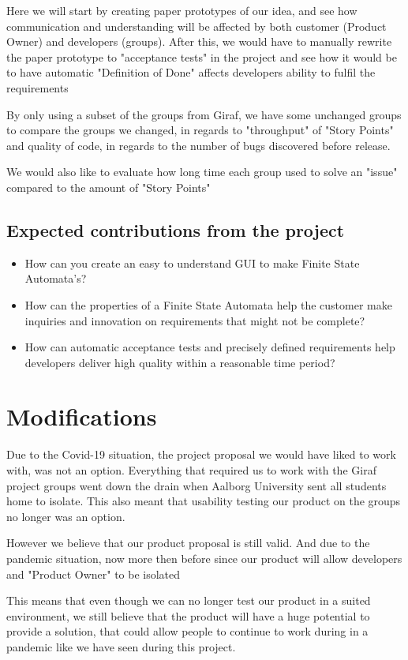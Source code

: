 Here we will start by creating paper prototypes of our idea, and see how communication and understanding will be affected by both customer (Product Owner) and developers (groups).
After this, we would have to manually rewrite the paper prototype to "acceptance tests" in the project and see how it would be to have automatic "Definition of Done" affects developers ability to fulfil the requirements

By only using a subset of the groups from Giraf, we have some unchanged groups to compare the groups we changed, in regards to "throughput" of "Story Points" and quality of code, in regards to the number of bugs discovered before release.

We would also like to evaluate how long time each group used to solve an "issue" compared to the amount of "Story Points" 


\subsection{Expected contributions from the project}
\begin{itemize}
    \item How can you create an easy to understand GUI to make Finite State Automata's?
    \item How can the properties of a Finite State Automata help the customer make inquiries and innovation on requirements that might not be complete?
    \item How can automatic acceptance tests and precisely defined requirements help developers deliver high quality within a reasonable time period?
\end{itemize}
\section{Modifications}
Due to the Covid-19 situation, the project proposal we would have liked to work with, was not an option.
Everything that required us to work with the Giraf project groups went down the drain when Aalborg University sent all students home to isolate.
This also meant that usability testing our product on the groups no longer was an option. 

However we believe that our product proposal is still valid.
And due to the pandemic situation, now more then before since our product will allow developers and "Product Owner" to be isolated

This means that even though we can no longer test our product in a suited environment, we still believe that the product will have a huge potential to provide a solution, that could allow people to continue to work during in a pandemic like we have seen during this project.